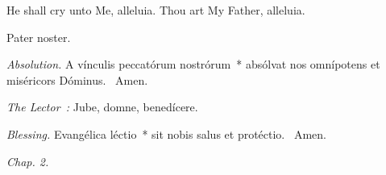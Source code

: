 {  \bigskip
  {
    {He shall cry unto Me, alleluia.}
    {Thou art My Father, alleluia.}
  }

  {
    {Pater noster.}

    \smallskip
    \emph{Absolution.} A vínculis peccatórum nostrórum~* absólvat nos omnípotens et miséricors Dóminus. \Rbar{}~Amen.

    \emph{The Lector~:} Jube, domne, benedícere.

    \emph{Blessing.} Evangélica léctio~* sit nobis salus et protéctio. \Rbar{}~Amen.
  }

  \bigskip{}
  {


  }

  {
    \hspace{10ex}{Lesson VII.}\hfill\emph{Chap. 2.}\hspace{10ex}

}}
